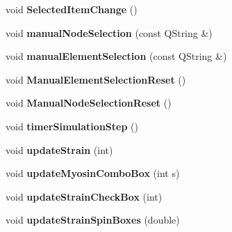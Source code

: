 \begin{DoxyCompactItemize}
\item 
\hypertarget{classMainWindow_ab2c0d4d0d84826cc032a45ea4783dde5}{}void {\bfseries Selected\+Item\+Change} ()\label{classMainWindow_ab2c0d4d0d84826cc032a45ea4783dde5}

\item 
\hypertarget{classMainWindow_a99f4fa67c708306ecac0eb351c6968d6}{}void {\bfseries manual\+Node\+Selection} (const Q\+String \&)\label{classMainWindow_a99f4fa67c708306ecac0eb351c6968d6}

\item 
\hypertarget{classMainWindow_af6253ec8c287b675a80e80bdd0ad31cc}{}void {\bfseries manual\+Element\+Selection} (const Q\+String \&)\label{classMainWindow_af6253ec8c287b675a80e80bdd0ad31cc}

\item 
\hypertarget{classMainWindow_ad613f2de4daee9c84828dc0490b00ffa}{}void {\bfseries Manual\+Element\+Selection\+Reset} ()\label{classMainWindow_ad613f2de4daee9c84828dc0490b00ffa}

\item 
\hypertarget{classMainWindow_a52630b918235794e8ff6cfd6abfc4b7f}{}void {\bfseries Manual\+Node\+Selection\+Reset} ()\label{classMainWindow_a52630b918235794e8ff6cfd6abfc4b7f}

\item 
\hypertarget{classMainWindow_a59dd1f2fe0d6900a98feff45c94e23e6}{}void {\bfseries timer\+Simulation\+Step} ()\label{classMainWindow_a59dd1f2fe0d6900a98feff45c94e23e6}

\item 
\hypertarget{classMainWindow_a0dce0c101c73abe3b5f347cd4dacfbd3}{}void {\bfseries update\+Strain} (int)\label{classMainWindow_a0dce0c101c73abe3b5f347cd4dacfbd3}

\item 
\hypertarget{classMainWindow_aae2aa15cd495069aebec712f4064c158}{}void {\bfseries update\+Myosin\+Combo\+Box} (int s)\label{classMainWindow_aae2aa15cd495069aebec712f4064c158}

\item 
\hypertarget{classMainWindow_a99a35d2b2c33a4cadab365403816c15c}{}void {\bfseries update\+Strain\+Check\+Box} (int)\label{classMainWindow_a99a35d2b2c33a4cadab365403816c15c}

\item 
\hypertarget{classMainWindow_a18d28bd55cc52f4b81d1c09e655d9711}{}void {\bfseries update\+Strain\+Spin\+Boxes} (double)\label{classMainWindow_a18d28bd55cc52f4b81d1c09e655d9711}


\end{DoxyCompactItemize}
